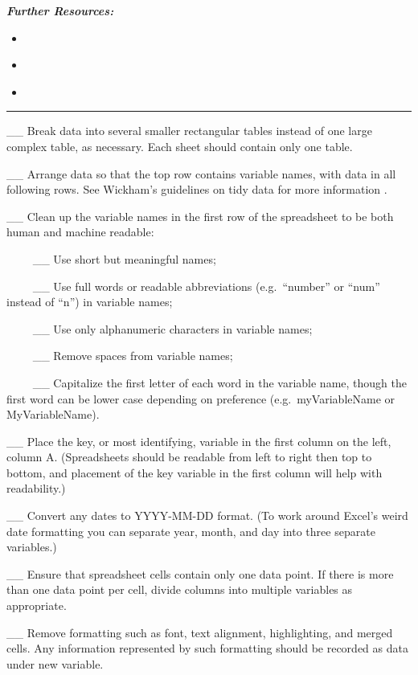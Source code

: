 \documentclass[
]{book}
\providecommand{\tightlist}{%
  \setlength{\itemsep}{0pt}\setlength{\parskip}{0pt}}
\begin{document}
\textbf{\emph{Further Resources:}}

\begin{itemize}
\tightlist
\item
  \citep{broman_data_2018}
\item
  \citep{oxford_accessibility_2023}
\item
  \citep{wickham_tidy_2014}
\end{itemize}

\begin{center}\rule{0.5\linewidth}{0.5pt}\end{center}

\_\_ Break data into several smaller rectangular tables instead of one large complex table, as necessary. Each sheet should contain only one table.

\_\_ Arrange data so that the top row contains variable names, with data in all following rows. See Wickham's guidelines on tidy data for more information \citep{wickham_tidy_2014}.

\_\_ Clean up the variable names in the first row of the spreadsheet to be both human and machine readable:

~~~~ \_\_ Use short but meaningful names;

~~~~ \_\_ Use full words or readable abbreviations (e.g.~``number'' or ``num'' instead of ``n'') in variable names;

~~~~ \_\_ Use only alphanumeric characters in variable names;

~~~~ \_\_ Remove spaces from variable names;

~~~~ \_\_ Capitalize the first letter of each word in the variable name, though the first word can be lower case depending on preference (e.g.~myVariableName or MyVariableName).

\_\_ Place the key, or most identifying, variable in the first column on the left, column A. (Spreadsheets should be readable from left to right then top to bottom, and placement of the key variable in the first column will help with readability.)

\_\_ Convert any dates to YYYY-MM-DD format. (To work around Excel's weird date formatting you can separate year, month, and day into three separate variables.)

\_\_ Ensure that spreadsheet cells contain only one data point. If there is more than one data point per cell, divide columns into multiple variables as appropriate.

\_\_ Remove formatting such as font, text alignment, highlighting, and merged cells. Any information represented by such formatting should be recorded as data under new variable.
\end{document}
